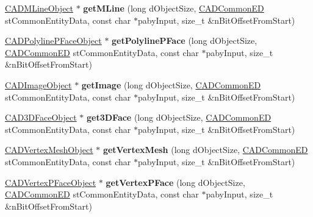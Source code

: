 \begin{DoxyCompactItemize}
\item 
\hyperlink{class_c_a_d_m_line_object}{C\+A\+D\+M\+Line\+Object} $\ast$ {\bfseries get\+M\+Line} (long d\+Object\+Size, \hyperlink{struct_c_a_d_common_e_d}{C\+A\+D\+Common\+ED} st\+Common\+Entity\+Data, const char $\ast$paby\+Input, size\+\_\+t \&n\+Bit\+Offset\+From\+Start)\hypertarget{class_d_w_g_file_r2000_a69f1d087e05c1f6625a5c7a0fad55619}{}\label{class_d_w_g_file_r2000_a69f1d087e05c1f6625a5c7a0fad55619}

\item 
\hyperlink{class_c_a_d_polyline_p_face_object}{C\+A\+D\+Polyline\+P\+Face\+Object} $\ast$ {\bfseries get\+Polyline\+P\+Face} (long d\+Object\+Size, \hyperlink{struct_c_a_d_common_e_d}{C\+A\+D\+Common\+ED} st\+Common\+Entity\+Data, const char $\ast$paby\+Input, size\+\_\+t \&n\+Bit\+Offset\+From\+Start)\hypertarget{class_d_w_g_file_r2000_a7c69846ee9c90131b2b1976b4aac06bd}{}\label{class_d_w_g_file_r2000_a7c69846ee9c90131b2b1976b4aac06bd}

\item 
\hyperlink{class_c_a_d_image_object}{C\+A\+D\+Image\+Object} $\ast$ {\bfseries get\+Image} (long d\+Object\+Size, \hyperlink{struct_c_a_d_common_e_d}{C\+A\+D\+Common\+ED} st\+Common\+Entity\+Data, const char $\ast$paby\+Input, size\+\_\+t \&n\+Bit\+Offset\+From\+Start)\hypertarget{class_d_w_g_file_r2000_ae839c02b68f55e3c18ed815379213b1d}{}\label{class_d_w_g_file_r2000_ae839c02b68f55e3c18ed815379213b1d}

\item 
\hyperlink{class_c_a_d3_d_face_object}{C\+A\+D3\+D\+Face\+Object} $\ast$ {\bfseries get3\+D\+Face} (long d\+Object\+Size, \hyperlink{struct_c_a_d_common_e_d}{C\+A\+D\+Common\+ED} st\+Common\+Entity\+Data, const char $\ast$paby\+Input, size\+\_\+t \&n\+Bit\+Offset\+From\+Start)\hypertarget{class_d_w_g_file_r2000_a1c9fb25a1411113abc0683cbb1a2d4e0}{}\label{class_d_w_g_file_r2000_a1c9fb25a1411113abc0683cbb1a2d4e0}

\item 
\hyperlink{class_c_a_d_vertex_mesh_object}{C\+A\+D\+Vertex\+Mesh\+Object} $\ast$ {\bfseries get\+Vertex\+Mesh} (long d\+Object\+Size, \hyperlink{struct_c_a_d_common_e_d}{C\+A\+D\+Common\+ED} st\+Common\+Entity\+Data, const char $\ast$paby\+Input, size\+\_\+t \&n\+Bit\+Offset\+From\+Start)\hypertarget{class_d_w_g_file_r2000_ab6cfe63adcd1492c073a72cab4fb06be}{}\label{class_d_w_g_file_r2000_ab6cfe63adcd1492c073a72cab4fb06be}

\item 
\hyperlink{class_c_a_d_vertex_p_face_object}{C\+A\+D\+Vertex\+P\+Face\+Object} $\ast$ {\bfseries get\+Vertex\+P\+Face} (long d\+Object\+Size, \hyperlink{struct_c_a_d_common_e_d}{C\+A\+D\+Common\+ED} st\+Common\+Entity\+Data, const char $\ast$paby\+Input, size\+\_\+t \&n\+Bit\+Offset\+From\+Start)\hypertarget{class_d_w_g_file_r2000_a9cb53cb67a2614dca7fa8ef3bc4babfd}{}\label{class_d_w_g_file_r2000_a9cb53cb67a2614dca7fa8ef3bc4babfd}


\end{DoxyCompactItemize}
